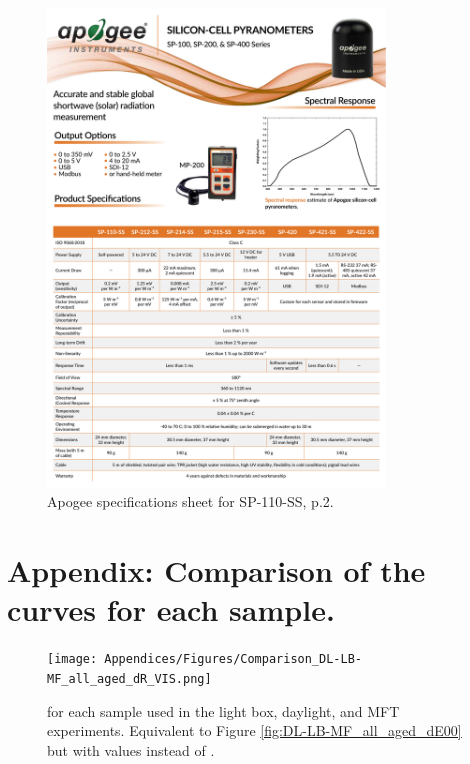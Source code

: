 \begin{appendices}
\begin{figure}[!h]
\centering
\includegraphics[width=0.8\textwidth]{Appendices/Apogee_SP-110-SS_spec-sheet_p2.pdf}
\caption*{Apogee specifications sheet for SP-110-SS, p.2.}
\end{figure}




\newpage
\section[\hspace{0.3cm}Comparison of the \dRvis curves for each sample]{ Appendix: Comparison of the \dRvis curves for each sample.}
\label{app:ch4_LB-DL-MF_all_dRvis}

\begin{figure}[!h]
\centering
\texttt{[image: Appendices/Figures/Comparison\_DL-LB-MF\_all\_aged\_dR\_VIS.png]}
\caption*{\dRvis for each sample used in the light box, daylight, and MFT experiments. Equivalent to Figure \ref{fig:DL-LB-MF_all_aged_dE00} but with \dRvis values instead of \dEOO.}
\label{fig:DL-LB-MF_all_aged_dRvis}
\end{figure}




\end{appendices}
